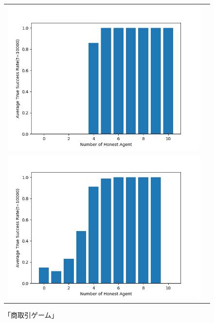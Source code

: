 \documentclass[twocolumn, a4j]{article}
\begin{document}
\begin{figure}[h]
  \begin{tabular}{cc}
    \begin{minipage}[t]{1\hsize}
      \centering
      \includegraphics[keepaspectratio, width=1\linewidth]{ethical-aggregate.png}
      \caption{「倫理ある商取引ゲーム」}
      \label{ethical-experiment-aggregate}
    \end{minipage} \\
    \begin{minipage}[t]{1\hsize}
      \centering
      \includegraphics[keepaspectratio, width=1\linewidth]{no-ethical-aggregate.png}
      \caption{「商取引ゲーム」}
      \label{non-ethical-experiment-aggregate}
    \end{minipage}
  \end{tabular}
\end{figure}
\end{document}
